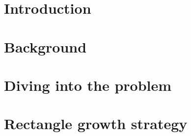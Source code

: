 \documentclass{report}
\begin{document}
\chapter{Introduction}


\chapter{Background}


\chapter{Diving into the problem}



\chapter{Rectangle growth strategy}

\end{document}
